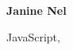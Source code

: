 \documentclass[a4paper,10pt]{article}
\begin{document}
\begin{center}\LARGE \textbf{Janine Nel}\end{center}



\begin{center}\normalsize JavaScript,\end{center}
\end{document}
